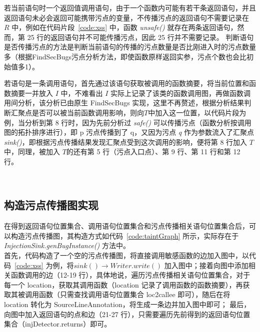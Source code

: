 若当前语句时一个返回值调用语句，由于一个函数内可能有若干条返回语句，并且返回语句未必会返回可能携带污点的变量，不传播污点的返回语句不需要记录在 $R$ 中，例如在代码片段~\ref{code:xss} 中，函数 \textit{unsafe()} 就存在两条返回语句，然而，第 25 行的返回语句并不可能传播污点，因此 25 行并不需要记录。 判断语句是否传播污点的方法是判断当前语句的传播的污点数量是否比刚进入时的污点数量多（根据FindSecBugs污点分析方法，即使函数原样返回实参，污点个数也会比初始值多1）。

若语句是一条调用语句，首先通过该语句获取被调用的函数摘要，将当前位置和函数摘要一并放入 $I$ 中，不难看出 $I$ 实际上记录了该类的函数调用图，再做函数调用间分析，该分析已由原生 FindSecBugs 实现，这里不再赘述，根据分析结果判断汇聚点是否可以被当前函数调用影响，则向$T$中加入这一位置，以代码片段为例，当分析到第 8 行时，因为先前分析过 \textit{safe()} 可以传播污点（函数分析按调用图的拓扑排序进行），即 p 污点传播到了 q，又因为污点 \textit{q} 作为参数流入了汇聚点 \textit{sink()}，即根据污点传播结果发现汇聚点受到这次调用的影响，便将第 8 行加入 $T$ 中，同理，被加入 $T$的还有第 5 行（污点入口点）、第 9 行、第 11 行和第 12 行。\\

\begin{minipage}[!htbp]{0.9\textwidth}
    
\end{minipage}\\

\subsection{构造污点传播图实现}
\vspace{0.7cm}
在得到返回语句位置集合、调用语句位置集合和污点传播相关语句位置集合后，可以构造污点传播图，其构造方式如代码~\ref{code:taintGraph} 所示，实际存在于 \textit{InjectionSink.genBugInstance()} 方法中。\\

首先，代码构造了一个空的污点传播图，将直接调用敏感函数的边加入图中，以代码~\ref{code:xss} 为例，将$sink() \rightarrow Writer.write()$ 加入图中；接着向图中添加相关函数调用的边（12-19 行），具体地说，遍历污点传播相关语句位置集合，对于每一个 location，获取其调用函数（location 记录了调用函数的函数摘要），再获取其被调用函数（只需查找调用语句位置集合 loc2callee 即可），随后在将 location 转化为 SourceLineAnnotation，将生成一条边并加入图中即可； 最后，向图中加入返回语句的点和边（21-27 行），只需要遍历先前得到的返回语句位置集合（injDetector.returns）即可。\\

